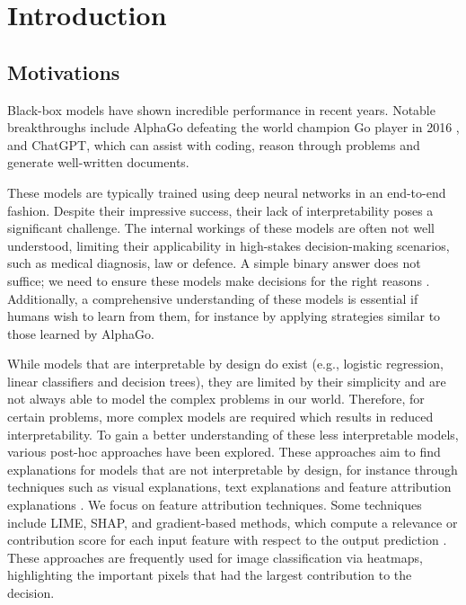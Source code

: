 \chapter{Introduction}

\setcounter{page}{1} %


\section{Motivations}
Black-box models have shown incredible performance in recent years. Notable breakthroughs include AlphaGo defeating the world champion Go player in 2016 \citep{fuAlphaGoMonteCarlo2016}, and ChatGPT, which can assist with coding, reason through problems and generate well-written documents.

These models are typically trained using deep neural networks in an end-to-end fashion. Despite their impressive success, their lack of interpretability poses a significant challenge. The internal workings of these models are often not well understood, limiting their applicability in high-stakes decision-making scenarios, such as medical diagnosis, law or defence. A simple binary answer does not suffice; we need to ensure these models make decisions for the right reasons \citep{alammarExplainableAIGuide2021}. Additionally, a comprehensive understanding of these models is essential if humans wish to learn from them, for instance by applying strategies similar to those learned by AlphaGo.

While models that are interpretable by design do exist (e.g., logistic regression, linear classifiers and decision trees), they are limited by their simplicity and are not always able to model the complex problems in our world. Therefore, for certain problems, more complex models are required which results in reduced interpretability.
To gain a better understanding of these less interpretable models, various post-hoc approaches have been explored. These approaches aim to find explanations for models that are not interpretable by design, for instance through techniques such as visual explanations, text explanations and feature attribution explanations \citep{barredoarrietaExplainableArtificialIntelligence2020a}. We focus on feature attribution techniques. Some techniques include LIME, SHAP, and gradient-based methods, which compute a relevance or contribution score for each input feature with respect to the output prediction \citep{simonyanDeepConvolutionalNetworks2014, ribeiroWhyShouldTrust2016, lundbergUnifiedApproachInterpreting2017, molnarInterpretableMachineLearning2022}. These approaches are frequently used for image classification via heatmaps, highlighting the important pixels that had the largest contribution to the decision.

